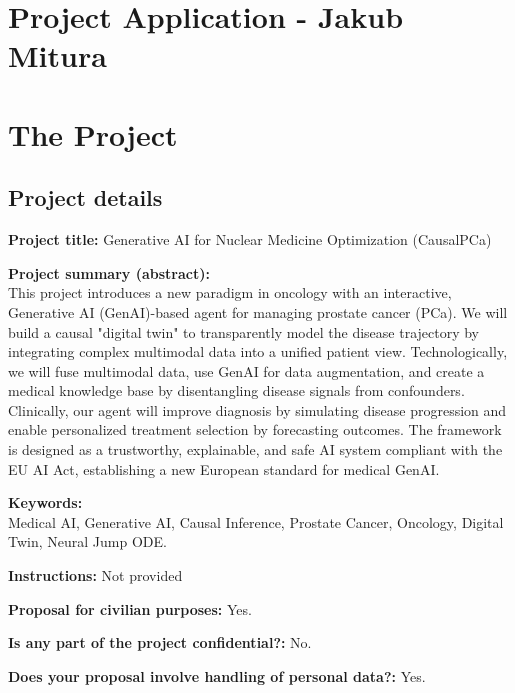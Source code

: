 \documentclass[11pt, a4paper]{article}
\begin{document}
\section*{Project Application - Jakub Mitura}

\section*{The Project}

\subsection*{Project details}

\noindent\textbf{Project title:} Generative AI for Nuclear Medicine Optimization (CausalPCa)

\vspace{0.5em}
\noindent\textbf{Project summary (abstract):} \\
This project introduces a new paradigm in oncology with an interactive, Generative AI (GenAI)-based agent for managing prostate cancer (PCa). We will build a causal "digital twin" to transparently model the disease trajectory by integrating complex multimodal data into a unified patient view. Technologically, we will fuse multimodal data, use GenAI for data augmentation, and create a medical knowledge base by disentangling disease signals from confounders. Clinically, our agent will improve diagnosis by simulating disease progression and enable personalized treatment selection by forecasting outcomes. The framework is designed as a trustworthy, explainable, and safe AI system compliant with the EU AI Act, establishing a new European standard for medical GenAI.

\vspace{0.5em}
\noindent\textbf{Keywords:} \\
Medical AI, Generative AI, Causal Inference, Prostate Cancer, Oncology, Digital Twin, Neural Jump ODE.

\vspace{0.5em}
\noindent\textbf{Instructions:} Not provided

\vspace{0.5em}
\noindent\textbf{Proposal for civilian purposes:} Yes.

\vspace{0.5em}
\noindent\textbf{Is any part of the project confidential?:} No.

\vspace{0.5em}
\noindent\textbf{Does your proposal involve handling of personal data?:} Yes.
\end{document}
